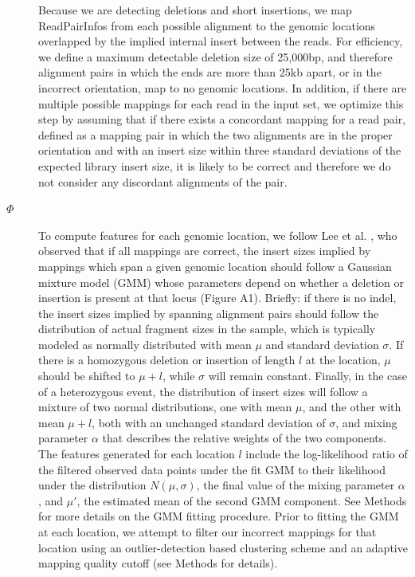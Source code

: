 \documentclass [11pt] {report}
\begin{document}
\begin{description}
\item[] Because we are detecting deletions and short insertions, we map ReadPairInfos from each possible alignment to the genomic locations overlapped by the implied internal insert between the reads. For efficiency, we define a maximum detectable deletion size of 25,000bp, and therefore alignment pairs in which the ends are more than 25kb apart, or in the incorrect orientation, map to no genomic locations. In addition, if there are multiple possible mappings for each read in the input set, we optimize this step by assuming that if there exists a concordant mapping for a read pair, defined as a mapping pair in which the two alignments are in the proper orientation and with an insert size within three standard deviations of the expected library insert size, it is likely to be correct and therefore we do not consider any discordant alignments of the pair.
\item[$\Phi$] To compute features for each genomic location, we follow Lee et al. \cite{Lee:2009da}, who observed that if all mappings are correct, the insert sizes implied by mappings which span a given genomic location should follow a Gaussian mixture model (GMM) whose parameters depend on whether a deletion or insertion is present at that locus (Figure A1). Briefly: if there is no indel, the insert sizes implied by spanning alignment pairs should follow the distribution of actual fragment sizes in the sample, which is typically modeled as normally distributed with mean $\mu$ and standard deviation $\sigma$. If there is a homozygous deletion or insertion of length $l$ at the location, $\mu$ should be shifted to $\mu + l$, while $\sigma$ will remain constant. Finally, in the case of a heterozygous event, the distribution of insert sizes will follow a mixture of two normal distributions, one with mean $\mu$, and the other with mean $\mu + l$, both with an unchanged standard deviation of $\sigma$, and mixing parameter $\alpha$ that describes the relative weights of the two components. The features generated for each location $l$ include the log-likelihood ratio of the filtered observed data points under the fit GMM to their likelihood under the distribution $N(\mu,\sigma)$, the final value of the mixing parameter $\alpha$, and $\mu'$, the estimated mean of the second GMM component. See Methods for more details on the GMM fitting procedure. Prior to fitting the GMM at each location, we attempt to filter our incorrect mappings for that location using an outlier-detection based clustering scheme and an adaptive mapping quality cutoff (see Methods for details).


\end{description}
\end{document}
